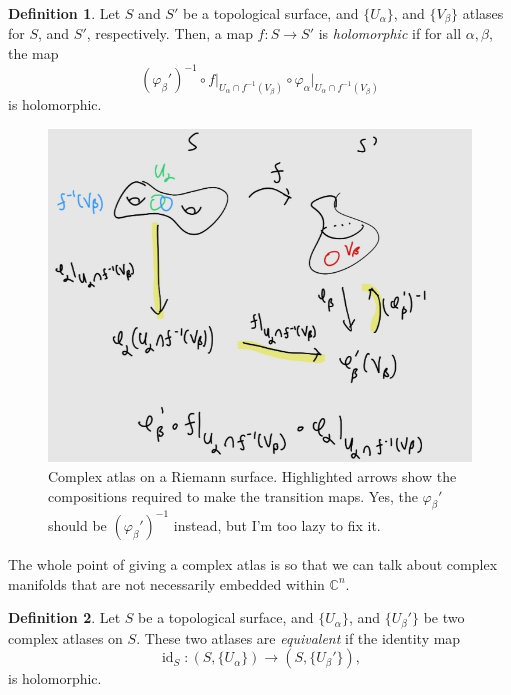 \documentclass[a4paper]{report}
\theoremstyle{definition}
\newtheorem{definition}{Definition}
\theoremstyle{remark}
\theoremstyle{proposition}
\theoremstyle{conjecture}
\theoremstyle{lemma}
\theoremstyle{corollary}
\theoremstyle{exercise}
\theoremstyle{example}
\newcommand{\C}{\mathbb{C}}
\newcommand{\on}{\operatorname}
\begin{document}
\begin{definition}
    Let $S$ and $S'$ be a topological surface, and $\lbrace U_\alpha\rbrace$,
    and $\lbrace V_\beta\rbrace$ atlases for $S$, and $S'$, respectively. 
    Then, a map $f: S \to S'$ is \emph{holomorphic} if for all $\alpha,\beta$,
    the map 
    $$(\varphi_\beta')^{-1} \circ f\vert_{U_\alpha \cap f^{-1}(V_\beta)} \circ \varphi_\alpha\vert_{U_\alpha\cap f^{-1}(V_\beta)}$$ is holomorphic.
    \begin{figure}[h!]
        \centering
        \includegraphics[scale=0.35]{fig7.jpg}
        \caption{Complex atlas on a Riemann surface. Highlighted arrows show 
            the compositions required to make the transition maps. Yes,
            the $\varphi_\beta'$ should be $(\varphi_\beta')^{-1}$ instead, but 
            I'm too lazy to fix it.}
    \end{figure}
\end{definition}

The whole point of giving a complex atlas is so that we can talk about 
complex manifolds that are not necessarily embedded within $\C^n$.

\begin{definition}
    Let $S$ be a topological surface, and $\lbrace U_\alpha\rbrace$,
    and $\lbrace U_\beta'\rbrace$ be two complex atlases on $S$.
    These two atlases are \emph{equivalent} if the identity map 
    $$\on{id}_S : (S,\lbrace U_\alpha\rbrace) \longrightarrow (S,\lbrace U_\beta'\rbrace),$$ is holomorphic. 
\end{definition}
\end{document}
